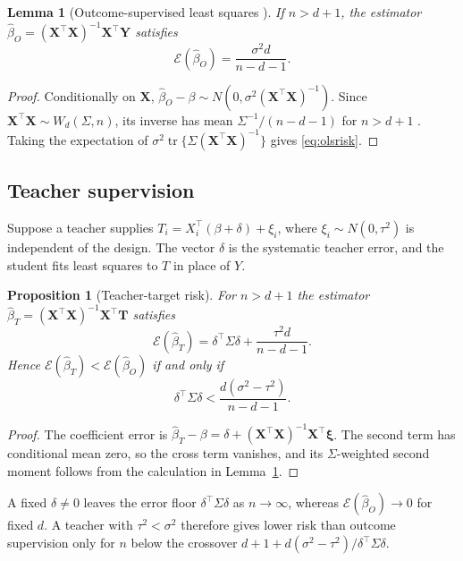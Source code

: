 \documentclass[11pt]{article}
\newtheorem{lemma}[theorem]{Lemma}
\newtheorem{proposition}[theorem]{Proposition}
\theoremstyle{remark}
\newcommand{\1}{\mathbf 1}
\begin{document}
\begin{lemma}[Outcome-supervised least squares {\cite{breiman}}]\label{th:ols}
If $n>d+1$, the estimator $\widehat\beta_O=(\mathbf X^\top\mathbf X)^{-1}\mathbf X^\top\mathbf Y$ satisfies
\begin{equation}\label{eq:olsrisk}
\mathcal E(\widehat\beta_O)=\frac{\sigma^2d}{n-d-1}.
\end{equation}
\end{lemma}
\begin{proof}
Conditionally on $\mathbf X$, $\widehat\beta_O-\beta\sim N(0,\sigma^2(\mathbf X^\top\mathbf X)^{-1})$. Since $\mathbf X^\top\mathbf X\sim W_d(\Sigma,n)$, its inverse has mean $\Sigma^{-1}/(n-d-1)$ for $n>d+1$ \cite{anderson,muirhead}. Taking the expectation of $\sigma^2\operatorname{tr}\{\Sigma(\mathbf X^\top\mathbf X)^{-1}\}$ gives \eqref{eq:olsrisk}.
\end{proof}

\subsection{Teacher supervision}
Suppose a teacher supplies $T_i=X_i^\top(\beta+\delta)+\xi_i$, where $\xi_i\sim N(0,\tau^2)$ is independent of the design. The vector $\delta$ is the systematic teacher error, and the student fits least squares to $T$ in place of $Y$.

\begin{proposition}[Teacher-target risk]\label{th:teacher}
For $n>d+1$ the estimator $\widehat\beta_T=(\mathbf X^\top\mathbf X)^{-1}\mathbf X^\top\mathbf T$ satisfies
\begin{equation}\label{eq:teacherrisk}
\mathcal E(\widehat\beta_T)=\delta^\top\Sigma\delta+\frac{\tau^2d}{n-d-1}.
\end{equation}
Hence $\mathcal E(\widehat\beta_T)<\mathcal E(\widehat\beta_O)$ if and only if
\begin{equation}\label{eq:criterion}
\delta^\top\Sigma\delta<\frac{d(\sigma^2-\tau^2)}{n-d-1}.
\end{equation}
\end{proposition}
\begin{proof}
The coefficient error is $\widehat\beta_T-\beta=\delta+(\mathbf X^\top\mathbf X)^{-1}\mathbf X^\top\bm\xi$. The second term has conditional mean zero, so the cross term vanishes, and its $\Sigma$-weighted second moment follows from the calculation in Lemma~\ref{th:ols}.
\end{proof}

A fixed $\delta\neq0$ leaves the error floor $\delta^\top\Sigma\delta$ as $n\to\infty$, whereas $\mathcal E(\widehat\beta_O)\to0$ for fixed $d$. A teacher with $\tau^2<\sigma^2$ therefore gives lower risk than outcome supervision only for $n$ below the crossover $d+1+d(\sigma^2-\tau^2)/\delta^\top\Sigma\delta$.
\end{document}
